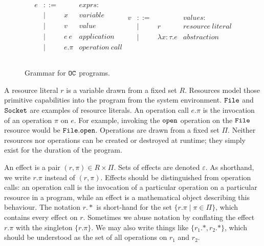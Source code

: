 \begin{figure}[h]
\vspace{-5pt}

\[
\begin{array}{lll}

\begin{array}{lllr}

e & ::= & ~ & exprs: \\
	& | & x & variable \\
	& | & v & value \\
	& | & e ~ e & application \\
	& | & e.\pi & operation~call \\
	&&\\

\end{array}

\begin{array}{lllr}

v & ::= & ~ & values: \\ 
	& | & r & resource~literal \\
	& | & \lambda x: \tau.e & abstraction \\
	&&\\

\end{array}

\end{array}
\]

\vspace{-7pt}
\caption{Grammar for $\mathtt{OC}$ programs.}
\label{fig:opercalc_grammar}
\end{figure}

A resource literal $r$ is a variable drawn from a fixed set $R$. Resources model those primitive capabilities into the program from the system environment. $\mathtt{File}$ and $\mathtt{Socket}$ are examples of resource literals. An operation call $e.\pi$ is the invocation of an operation $\pi$ on $e$. For example, invoking the $\mathtt{open}$ operation on the $\mathtt{File}$ resource would be $\mathtt{File.open}$. Operations are drawn from a fixed set $\Pi$. Neither resources nor operations can be created or destroyed at runtime; they simply exist for the duration of the program.

An effect is a pair $(r, \pi) \in R \times \Pi$. Sets of effects are denoted $\varepsilon$. As shorthand, we write $r.\pi$ instead of $(r, \pi)$. Effects should be distinguished from operation calls: an operation call is the invocation of a particular operation on a particular resource in a program, while an effect is a mathematical object describing this behaviour. The notation $r.*$ is short-hand for the set $\{ r.\pi \mid \pi \in \Pi \}$, which contains every effect on $r$. Sometimes we abuse notation by conflating the effect $r.\pi$ with the singleton $\{ r.\pi \}$. We may also write things like $\{ r_1.*, r_2.* \}$, which should be understood as the set of all operations on $r_1$ and $r_2$.\\


